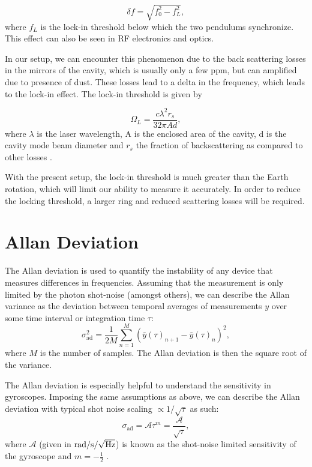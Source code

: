 \documentclass[a4paper]{report}
\numberwithin{equation}{section}
\begin{document}
\begin{equation}
		\delta f = \sqrt{f_{0}^2 - f_{L}^2},
\end{equation}
where $f_{L}$ is the lock-in threshold below which the two pendulums synchronize. This effect can also be seen in RF electronics and optics. 

In our setup, we can encounter this phenomenon due to the back scattering losses in the mirrors of the cavity, which is usually only a few ppm, but can amplified due to presence of dust. These losses lead to a delta in the frequency, which leads to the lock-in effect. The lock-in threshold is given by

\begin{equation}
		\Omega_{L} = \frac{c \lambda^2 r_{s}}{32 \pi  A d},
		\label{eq:lockin_thresh}
\end{equation}
where $\lambda$ is the laser wavelength, A is the enclosed area of the cavity, d is the cavity mode beam diameter and $r_{s}$ the fraction of backscattering as compared to other losses \cite{Liu}.

With the present setup, the lock-in threshold is much greater than the Earth rotation, which will limit our ability to measure it accurately. In order to reduce the locking threshold, a larger ring and reduced scattering losses will be required. 

\section{Allan Deviation} \label{sec:allan_dev}

The Allan deviation is used to quantify the instability of any device that measures differences in frequencies. Assuming that the
measurement is only limited by the photon shot-noise (amongst others), we can describe the Allan variance as the deviation
between temporal averages of measurements $y$ over some time interval or integration time $\tau$:
\begin{equation}
	\sigma_{{\text{ad}}}^2 = \frac{1}{2M} \sum\limits_{n=1}^M (\bar{y}(\tau)_{n+1} - \bar{y}(\tau)_n)^2,
	\label{eq:allan_def}
\end{equation}
where $M$ is the number of samples. The Allan deviation is then the square root of the variance. \par 

The Allan deviation is especially helpful to understand the sensitivity in gyroscopes. Imposing the same assumptions as above,
we can describe the Allan deviation with typical shot noise scaling $\propto 1 / \sqrt{\tau}$ as such:
\begin{equation}
	\sigma_{\text{ad}} = \mathcal{A} \tau ^ m = \frac{\mathcal{A}}{\sqrt{\tau}},
	\label{eq:allan_shotnoise}
\end{equation}
where $\mathcal{A}$ (given in $\si{\radian\per\second\per\sqrt{\hertz}}$) is known as the shot-noise limited sensitivity of the gyroscope and $m = -\frac{1}{2}$ \cite{Groh2021}. \par 
\end{document}
